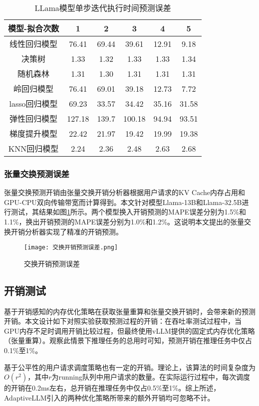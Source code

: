 \begin{table}[H]
  \centering
  \caption{LLama模型单步迭代执行时间预测误差}
  \label{Table:LLama模型单步迭代执行时间预测误差}
  \renewcommand{\arraystretch}{1.25}
  \small
  \begin{tabular}{c c c c c c}
    \toprule
    \textbf{模型-拟合次数} & \textbf{1} & \textbf{2} & \textbf{3} & \textbf{4} & \textbf{5} \\
    \midrule
    线性回归模型 & 76.41 & 69.44 & 39.61 & 12.91 & 9.18 \\ 
    决策树 & 1.33 & 1.32 & 1.33 & 1.33 & 1.34 \\ 
    随机森林 & 1.31 & 1.30 & 1.31 & 1.31 & 1.31 \\ 
    岭回归模型 & 76.41 & 69.01 & 39.18 & 12.73 & 7.72 \\ 
    lasso回归模型 & 69.23 & 33.57 & 34.42 & 35.16 & 31.58  \\ 
    弹性回归模型 & 127.18 & 139.7 & 100.18 & 94.94 & 93.51  \\ 
    梯度提升模型 & 22.42 & 21.97 & 19.42 & 19.99 & 19.38  \\ 
    KNN回归模型 & 2.24 & 2.36 & 2.48 & 2.63 & 2.68 \\ 
    \bottomrule
  \end{tabular}
\end{table}

\subsubsection{张量交换预测误差}

张量交换预测开销由张量交换开销分析器根据用户请求的KV Cache内存占用和GPU-CPU双向传输带宽而计算得到。本文针对模型Llama-13B和Llama-32.5B进行测试，其结果如图\ref{Fig:交换开销预测误差}所示。两个模型换入开销预测的MAPE误差分别为1.5\%和1.1\%，换出开销预测的MAPE误差分别为1.0\%和1.2\%。这说明本文提出的张量交换开销分析器实现了精准的开销预测。

\begin{figure}[!htbp]
  \centering
  \texttt{[image: 交换开销预测误差.png]}
  \caption{交换开销预测误差}
  \label{Fig:交换开销预测误差}
\end{figure}

\subsection{开销测试}

基于开销感知的内存优化策略在获取张量重算和张量交换开销时，会带来新的预测开销。本文设计如下对照实验获取预测过程的开销：在吞吐率测试过程中，当GPU内存不足时调用开销比较过程，但最终使用vLLM提供的固定式内存优化策略（张量重算）。观察此情景下推理任务的总用时可知，预测开销在推理任务中仅占0.1\%至1\%。

基于公平性的用户请求调度策略也有一定的开销。理论上，该算法的时间复杂度为$O(r^2)$，其中$r$为running队列中用户请求的数量。在实际运行过程中，每次调度的开销在0.2ms左右，总开销在推理任务中仅占0.5\%至1\%。综上所述，AdaptiveLLM引入的两种优化策略所带来的额外开销均可忽略不计。
